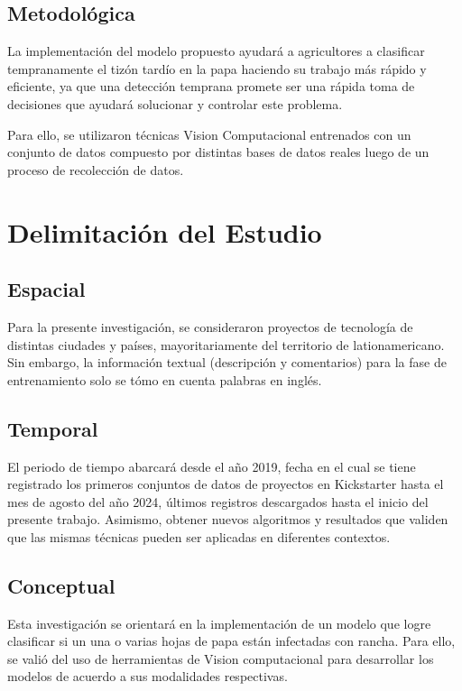 \subsection{Metodológica}
La implementación del modelo propuesto ayudará a agricultores a clasificar tempranamente el tizón tardío en la papa haciendo su trabajo más rápido y eficiente, ya que una detección temprana promete ser una rápida toma de decisiones que ayudará solucionar y controlar este problema.

Para ello, se utilizaron técnicas Vision Computacional entrenados con un conjunto de datos compuesto por distintas bases de datos reales luego de un proceso de recolección de datos.

\section{Delimitación del Estudio}

\subsection{Espacial}
Para la presente investigación, se consideraron proyectos de tecnología de distintas ciudades y países, mayoritariamente del territorio de lationamericano. Sin embargo, la información textual (descripción y comentarios) para la fase de entrenamiento solo se tómo en cuenta palabras en inglés.

\subsection{Temporal}
El periodo de tiempo abarcará desde el año 2019, fecha en el cual se tiene registrado los primeros conjuntos de datos de proyectos en Kickstarter hasta el mes de agosto del año 2024, últimos registros descargados hasta el inicio del presente trabajo. Asimismo, obtener nuevos algoritmos y resultados que validen que las mismas técnicas pueden ser aplicadas en diferentes contextos.

\subsection{Conceptual}
Esta investigación se orientará en la implementación de un modelo que logre clasificar si un una o varias hojas de papa están infectadas con rancha. Para ello, se valió del uso de herramientas de Vision computacional  para desarrollar los modelos de acuerdo a sus modalidades respectivas.